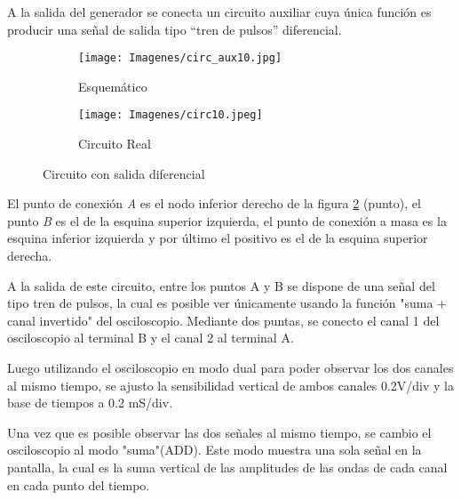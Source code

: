 \begin{table}[H]
    \centering
        \def\tablename{Tabla} 
        \caption{Disposición de controles del generador para experimento 10}
        \label{tab:gen10}
\end{table}
A la salida del generador se conecta un circuito auxiliar cuya única función es producir una señal de salida tipo “tren de pulsos” diferencial.

\begin{figure}[H]
        \begin{subfigure}[b]{0.6\textwidth}
        \centering  
        \texttt{[image: Imagenes/circ\_aux10.jpg]}
        \caption{Esquemático}
        \label{fig:esqCirc10}
    \end{subfigure}
    \hfill
    \begin{subfigure}[b]{0.4\textwidth}
        \centering
        \texttt{[image: Imagenes/circ10.jpeg]}
        \caption{Circuito Real}
        \label{fig:placa10}
    \end{subfigure}
    \caption{Circuito con salida diferencial}
    \label{fig::CircAux10}
\end{figure}

El punto de conexión \textit{A} es el nodo inferior derecho de la figura \ref{fig:placa10} (punto), el punto \textit{B} es el de la esquina superior izquierda, el punto de conexión a masa es la esquina inferior izquierda y por último el positivo es el de la esquina superior derecha.

A la salida de este circuito, entre los puntos A y B se dispone de una señal del tipo tren de pulsos, la cual es posible ver únicamente usando la función "suma + canal invertido" del osciloscopio. Mediante dos puntas, se conecto el canal 1 del osciloscopio al terminal B y el canal 2 al terminal A. 

Luego utilizando el osciloscopio en modo dual para poder observar los dos canales al mismo tiempo, se ajusto la sensibilidad vertical de ambos canales 0.2V/div y la base de tiempos a 0.2 mS/div. 




Una vez que es posible observar las dos señales al mismo tiempo, se cambio el osciloscopio al modo "suma"(ADD). Este modo muestra una sola señal en la pantalla, la cual es la suma vertical de las amplitudes de las ondas de cada canal en cada punto del tiempo.


